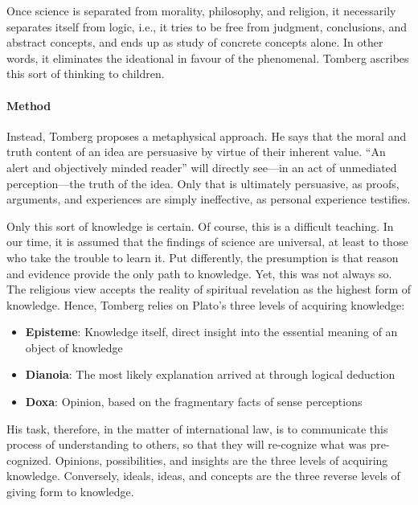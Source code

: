 Once science is separated from morality, philosophy, and religion, it necessarily separates itself from logic, i.e., it tries to be free from judgment, conclusions, and abstract concepts, and ends up as study of concrete concepts alone. In other words, it eliminates the ideational in favour of the phenomenal. Tomberg ascribes this sort of thinking to children.

\paragraph{Method}


Instead, Tomberg proposes a metaphysical approach. He says that the moral and truth content of an idea are persuasive by virtue of their inherent value. ``An alert and objectively minded reader'' will directly see---in an act of unmediated perception---the truth of the idea. Only that is ultimately persuasive, as proofs, arguments, and experiences are simply ineffective, as personal experience testifies.

Only this sort of knowledge is certain. Of course, this is a difficult teaching. In our time, it is assumed that the findings of science are universal, at least to those who take the trouble to learn it. Put differently, the presumption is that reason and evidence provide the only path to knowledge. Yet, this was not always so. The religious view accepts the reality of spiritual revelation as the highest form of knowledge. Hence, Tomberg relies on Plato's three levels of acquiring knowledge:

\begin{itemize}


\item \textbf{Episteme}: Knowledge itself, direct insight into the essential meaning of an object of knowledge

\item \textbf{Dianoia}: The most likely explanation arrived at through logical deduction

\item \textbf{Doxa}: Opinion, based on the fragmentary facts of sense perceptions
\end{itemize}


His task, therefore, in the matter of international law, is to communicate this process of understanding to others, so that they will re-cognize what was pre-cognized. Opinions, possibilities, and insights are the three levels of acquiring knowledge. Conversely, ideals, ideas, and concepts are the three reverse levels of giving form to knowledge.


